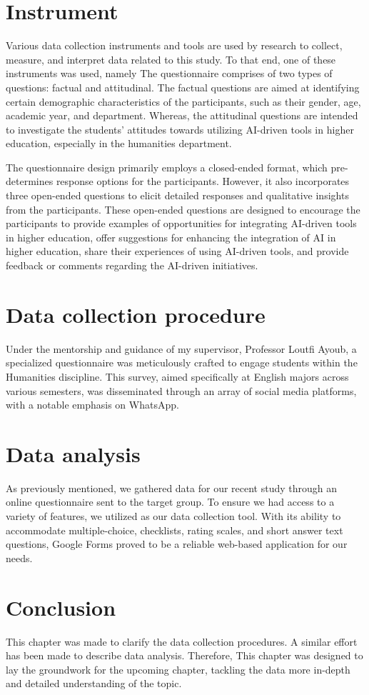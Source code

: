\section{Instrument}
\justifying

Various data collection instruments and tools are used by research to collect, measure, and interpret data related to this study.
To that end, one of these instruments was used, namely  The questionnaire comprises of two types
of questions: factual and attitudinal. The factual questions are aimed at identifying certain demographic characteristics
of the participants, such as their gender, age, academic year, and department. Whereas, the attitudinal questions
are intended to investigate the students' attitudes towards utilizing AI-driven tools in higher education,
especially in the humanities department.


The questionnaire design primarily employs a closed-ended format, which pre-determines response
options for the participants. However, it also incorporates three open-ended questions to elicit
detailed responses and qualitative insights from the participants. These open-ended questions are
designed to encourage the participants to provide examples of opportunities for integrating AI-driven
tools in higher education, offer suggestions for enhancing the integration of AI in higher education,
share their experiences of using AI-driven tools, and provide feedback or comments regarding the AI-driven initiatives.

\section{Data collection procedure}
Under the mentorship and guidance of my supervisor, Professor Loutfi Ayoub,
a specialized questionnaire was meticulously crafted to engage students within
the Humanities discipline. This survey, aimed specifically at English majors
across various semesters, was disseminated through an array
of social media platforms, with a notable emphasis on WhatsApp.
\section{Data analysis}

As previously mentioned, we gathered data for our recent study through an online questionnaire
sent to the target group. To ensure we had access to a variety of features, we utilized
 as our data collection tool. With its ability to accommodate multiple-choice,
checklists, rating scales, and short answer text questions, Google Forms proved to be a
reliable web-based application for our needs.
\section{Conclusion}
This chapter was made to clarify the data collection procedures. A similar effort has been made to
describe data analysis. Therefore, This chapter was designed to lay the groundwork for the upcoming
chapter, tackling the data more in-depth and detailed understanding of the topic.
